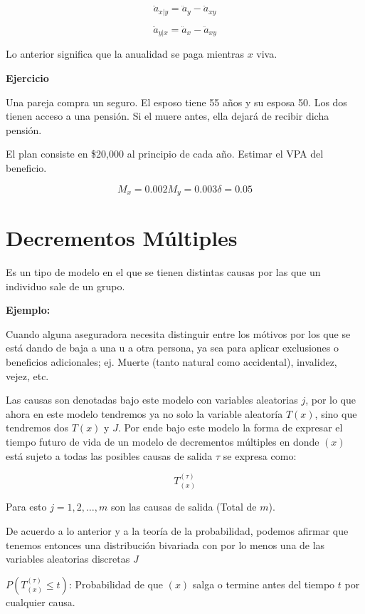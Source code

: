 \documentclass[12pt, a4paper, footinclude=true]{scrbook}
\newenvironment{callout-azul}{
	\begin{calloutbase}{blue}
	}{
	\end{calloutbase}
}
\begin{document}
	$$ \ddot{a}_{x|y} = \ddot{a}_{y} - \ddot{a}_{xy}$$
	
	$$\ddot{a}_{y|x}  = \ddot{a}_{x} - \ddot{a}_{xy}$$
	
	Lo anterior significa que la anualidad se paga mientras $x$ viva. 
	
	\textbf{Ejercicio}
	
	Una pareja compra un seguro. El esposo tiene 55 años y su esposa 50. Los dos tienen acceso a una pensión. Si el muere antes, ella dejará de recibir dicha pensión. 
	
	El plan consiste en \$20,000 al principio de cada año. Estimar el VPA del beneficio. 
	
	$$M_x = 0.002 M_y = 0.003 \delta = 0.05$$
	
	\section{Decrementos Múltiples}
	
	Es un tipo de modelo en el que se tienen distintas causas por las que un individuo sale de un grupo. 

	\begin{callout-azul}

		\textbf{Ejemplo:}

		Cuando alguna aseguradora necesita distinguir entre los mótivos por los que se está dando de baja a una u a otra persona, ya sea para aplicar exclusiones o beneficios adicionales; ej. Muerte (tanto natural como accidental), invalidez, vejez, etc. 

			\end{callout-azul}
	
	Las causas son denotadas bajo este modelo con variables aleatorias $j$, por lo que ahora en este modelo tendremos ya no solo la variable aleatoría $T(x)$, sino que tendremos dos $T(x)$ y $J$. Por ende bajo este modelo la forma de expresar el tiempo futuro de vida de un modelo de decrementos múltiples en donde $(x)$ está sujeto a todas las posibles causas de salida $\tau$ se expresa como: 

	$$T^{(\tau)}_{(x)}$$
	
	Para esto $j = 1, 2, \dots, m$ son las causas de salida (Total de $m$).
	
	De acuerdo a lo anterior y a la teoría de la probabilidad, podemos afirmar que tenemos entonces una distribución bivariada con por lo menos una de las variables aleatorias discretas $J$
	
	$P(T^{(\tau)}_{(x)} \leq t)$: Probabilidad de que $(x)$ salga o termine antes del tiempo $t$ por cualquier causa. 
	
\end{document}

